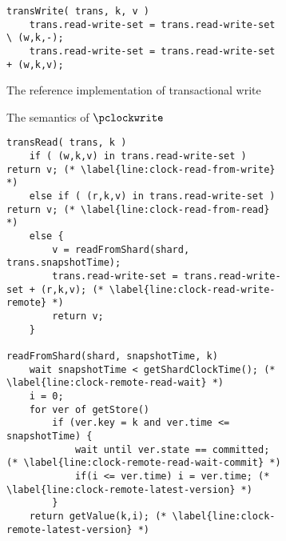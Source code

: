 \begin{figure}[!p]

\begin{subfigure}{\textwidth}
\begin{lstlisting}
transWrite( trans, k, v )
    trans.read-write-set = trans.read-write-set \ (w,k,-);
    trans.read-write-set = trans.read-write-set + (w,k,v);
\end{lstlisting}

\caption{The reference implementation of transactional write}
\label{lst:clock-si-write-value}
\end{subfigure}

\hrulefill


\begin{subfigure}{\textwidth}
\begin{mathpar}
\end{mathpar}

\caption{The semantics of \( \pclockwrite \)}
\label{fig:clock-write-rule}
\end{subfigure}

\hrulefill

\begin{subfigure}{\textwidth}
\begin{lstlisting}
transRead( trans, k )
    if ( (w,k,v) in trans.read-write-set ) return v; (* \label{line:clock-read-from-write} *)
    else if ( (r,k,v) in trans.read-write-set ) return v; (* \label{line:clock-read-from-read} *)
    else {
        v = readFromShard(shard, trans.snapshotTime);
        trans.read-write-set = trans.read-write-set + (r,k,v); (* \label{line:clock-read-write-remote} *)
        return v;
    }

readFromShard(shard, snapshotTime, k)
    wait snapshotTime < getShardClockTime(); (* \label{line:clock-remote-read-wait} *)
    i = 0;
    for ver of getStore() 
        if (ver.key = k and ver.time <= snapshotTime) { 
            wait until ver.state == committed; (* \label{line:clock-remote-read-wait-commit} *)
            if(i <= ver.time) i = ver.time; (* \label{line:clock-remote-latest-version} *)
        }
    return getValue(k,i); (* \label{line:clock-remote-latest-version} *)
\end{lstlisting}


\end{subfigure}
\end{figure}
